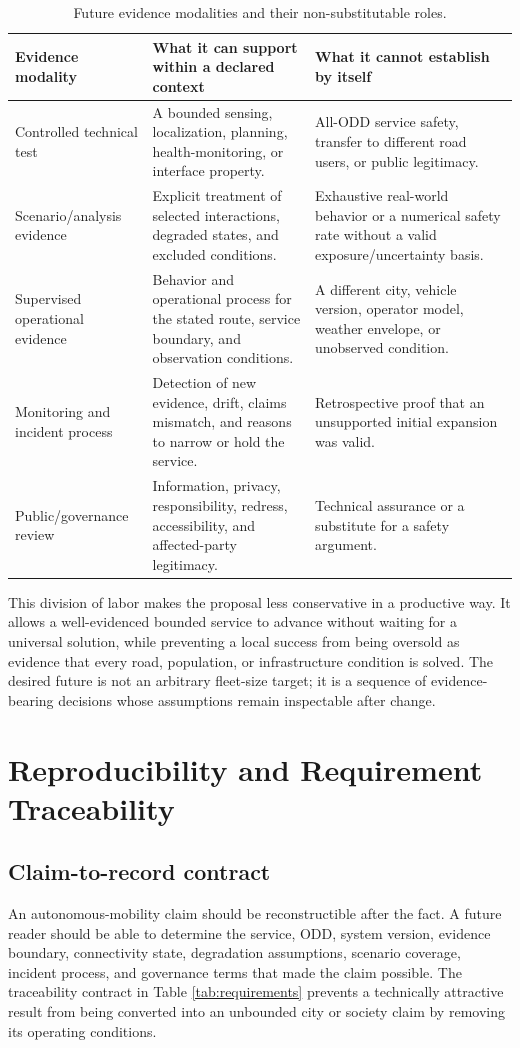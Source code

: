 \documentclass[conference]{../../../../Conference-LaTeX-template_10-17-19/IEEEtran}
\begin{document}
\begin{table}[!t]
\caption{Future evidence modalities and their non-substitutable roles.}
\label{tab:modalities}
\centering
\small
\begin{tabularx}{\textwidth}{lY Y}
\toprule
Evidence modality & What it can support within a declared context & What it cannot establish by itself \\
\midrule
Controlled technical test & A bounded sensing, localization, planning, health-monitoring, or interface property. & All-ODD service safety, transfer to different road users, or public legitimacy. \\
Scenario/analysis evidence & Explicit treatment of selected interactions, degraded states, and excluded conditions. & Exhaustive real-world behavior or a numerical safety rate without a valid exposure/uncertainty basis. \\
Supervised operational evidence & Behavior and operational process for the stated route, service boundary, and observation conditions. & A different city, vehicle version, operator model, weather envelope, or unobserved condition. \\
Monitoring and incident process & Detection of new evidence, drift, claims mismatch, and reasons to narrow or hold the service. & Retrospective proof that an unsupported initial expansion was valid. \\
Public/governance review & Information, privacy, responsibility, redress, accessibility, and affected-party legitimacy. & Technical assurance or a substitute for a safety argument. \\
\bottomrule
\end{tabularx}
\end{table}

This division of labor makes the proposal less conservative in a productive way. It allows a well-evidenced bounded service to advance without waiting for a universal solution, while preventing a local success from being oversold as evidence that every road, population, or infrastructure condition is solved. The desired future is not an arbitrary fleet-size target; it is a sequence of evidence-bearing decisions whose assumptions remain inspectable after change.

\section{Reproducibility and Requirement Traceability}
\subsection{Claim-to-record contract}
An autonomous-mobility claim should be reconstructible after the fact. A future reader should be able to determine the service, ODD, system version, evidence boundary, connectivity state, degradation assumptions, scenario coverage, incident process, and governance terms that made the claim possible. The traceability contract in Table \ref{tab:requirements} prevents a technically attractive result from being converted into an unbounded city or society claim by removing its operating conditions.
\end{document}
